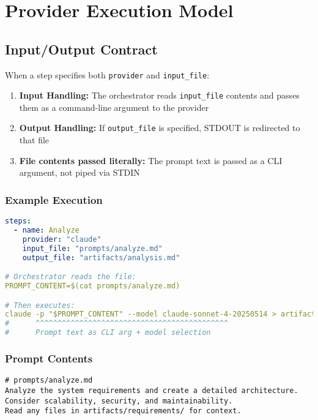 \documentclass[11pt,a4paper]{article}
\begin{document}
\section{Provider Execution Model}

\subsection{Input/Output Contract}

When a step specifies both \texttt{provider} and \texttt{input\_file}:

\begin{enumerate}
    \item \textbf{Input Handling:} The orchestrator reads \texttt{input\_file} contents and passes them as a command-line argument to the provider
    \item \textbf{Output Handling:} If \texttt{output\_file} is specified, STDOUT is redirected to that file
    \item \textbf{File contents passed literally:} The prompt text is passed as a CLI argument, not piped via STDIN
\end{enumerate}

\subsubsection{Example Execution}

\begin{lstlisting}[language=yaml, caption={Provider Execution Example}]
steps:
  - name: Analyze
    provider: "claude"
    input_file: "prompts/analyze.md"
    output_file: "artifacts/analysis.md"

# Orchestrator reads the file:
PROMPT_CONTENT=$(cat prompts/analyze.md)

# Then executes:
claude -p "$PROMPT_CONTENT" --model claude-sonnet-4-20250514 > artifacts/analysis.md
#      ^^^^^^^^^^^^^^^^^^^^^^^^^^^^^^^^^^^^^^^^^^^^
#      Prompt text as CLI arg + model selection
\end{lstlisting}

\subsubsection{Prompt Contents}

\begin{lstlisting}[caption={Example Prompt Content}]
# prompts/analyze.md
Analyze the system requirements and create a detailed architecture.
Consider scalability, security, and maintainability.
Read any files in artifacts/requirements/ for context.
\end{lstlisting}
\end{document}
